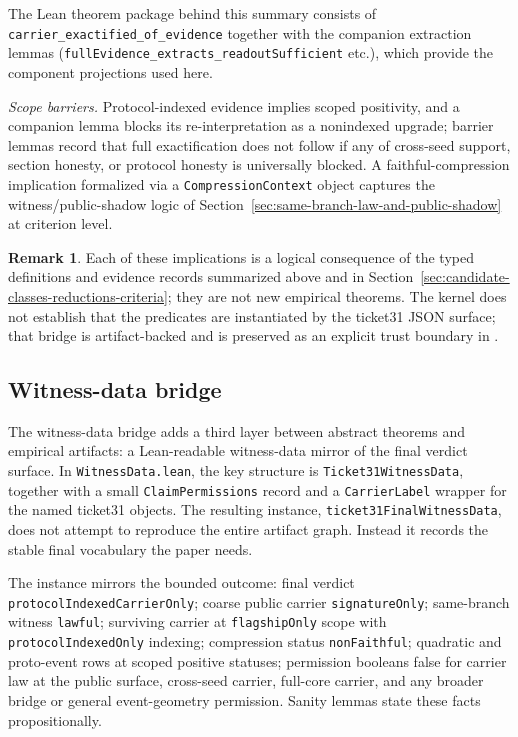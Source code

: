 \documentclass[11pt]{article}
\theoremstyle{definition}
\newtheorem{remark}[theorem]{Remark}
\begin{document}
The Lean theorem package behind this summary consists of
\texttt{carrier\_exactified\_of\_evidence} together with the companion
extraction lemmas (\texttt{fullEvidence\_extracts\_readoutSufficient} etc.),
which provide the component projections used here.

\emph{Scope barriers.} Protocol-indexed evidence implies scoped positivity, and a
companion lemma blocks its re-interpretation as a nonindexed upgrade; barrier
lemmas record that full exactification does not follow if any of cross-seed
support, section honesty, or protocol honesty is universally blocked. A
faithful-compression implication formalized via a \texttt{CompressionContext}
object captures the witness/public-shadow logic of
Section~\ref{sec:same-branch-law-and-public-shadow} at criterion level.

\begin{remark}
Each of these implications is a logical consequence of the typed definitions and
evidence records summarized above and in
Section~\ref{sec:candidate-classes-reductions-criteria}; they are not new
empirical theorems. The kernel does not establish that the predicates are
instantiated by the ticket31 JSON surface; that bridge is artifact-backed and is
preserved as an explicit trust boundary in
.
\end{remark}

\subsection{Witness-data bridge}

The witness-data bridge adds a third layer between abstract theorems and empirical
artifacts: a Lean-readable witness-data mirror of the final verdict surface. In
\texttt{WitnessData.lean}, the key
structure is \texttt{Ticket31WitnessData}, together with a small \texttt{ClaimPermissions}
record and a \texttt{CarrierLabel} wrapper for the named ticket31 objects. The resulting
instance, \texttt{ticket31FinalWitnessData}, does not attempt to reproduce the entire
artifact graph. Instead it records the stable final vocabulary the paper needs.

The instance mirrors the bounded outcome: final verdict
\texttt{protocolIndexedCarrierOnly}; coarse public carrier \texttt{signatureOnly};
same-branch witness \texttt{lawful}; surviving carrier at \texttt{flagshipOnly} scope
with \texttt{protocolIndexedOnly} indexing; compression status \texttt{nonFaithful};
quadratic and proto-event rows at scoped positive statuses; permission booleans false
for carrier law at the public surface, cross-seed carrier, full-core carrier, and any
broader bridge or general event-geometry permission. Sanity lemmas state these facts
propositionally.
\end{document}
